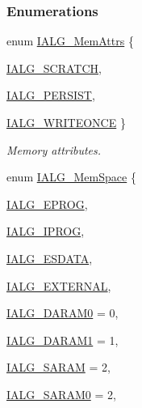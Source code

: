 \subsubsection*{Enumerations}
\begin{CompactItemize}
\item 
enum \hyperlink{group__ti__xdais___i_a_l_g_g805f1c1330403c05633277a073862e3d}{IALG\_\-Mem\-Attrs} \{ \par
\hyperlink{group__ti__xdais___i_a_l_g_gg805f1c1330403c05633277a073862e3d85e0509f7e82ebd01b57f899122de9b4}{IALG\_\-SCRATCH}, 
\par
\hyperlink{group__ti__xdais___i_a_l_g_gg805f1c1330403c05633277a073862e3d68adbe0194074e0474333b76f7d1e090}{IALG\_\-PERSIST}, 
\par
\hyperlink{group__ti__xdais___i_a_l_g_gg805f1c1330403c05633277a073862e3d42356e6aa11869bfd15f31472f49a7c6}{IALG\_\-WRITEONCE}
 \}
\begin{CompactList}\small\item\em Memory attributes. \item\end{CompactList}\item 
enum \hyperlink{group__ti__xdais___i_a_l_g_g262eb64dc7343999fa07d535ae163497}{IALG\_\-Mem\-Space} \{ \par
\hyperlink{group__ti__xdais___i_a_l_g_gg262eb64dc7343999fa07d535ae1634976410b22d1d073ab55b289ca2f3c03b35}{IALG\_\-EPROG}, 
\par
\hyperlink{group__ti__xdais___i_a_l_g_gg262eb64dc7343999fa07d535ae163497946577db145f691f81d7085fc51e2201}{IALG\_\-IPROG}, 
\par
\hyperlink{group__ti__xdais___i_a_l_g_gg262eb64dc7343999fa07d535ae16349785fff905ed5e83445e3424ce5ba03175}{IALG\_\-ESDATA}, 
\par
\hyperlink{group__ti__xdais___i_a_l_g_gg262eb64dc7343999fa07d535ae163497a98151c21c55ddaf8c1918d8007e5493}{IALG\_\-EXTERNAL}, 
\par
\hyperlink{group__ti__xdais___i_a_l_g_gg262eb64dc7343999fa07d535ae163497f6a85bf972a4d090e2c0e4d31565f879}{IALG\_\-DARAM0} =  0, 
\par
\hyperlink{group__ti__xdais___i_a_l_g_gg262eb64dc7343999fa07d535ae163497d7b3b18fc0263be0f0702d263f600d9c}{IALG\_\-DARAM1} =  1, 
\par
\hyperlink{group__ti__xdais___i_a_l_g_gg262eb64dc7343999fa07d535ae163497a5c6d8cfdb63c11fafd22bb87204c5cd}{IALG\_\-SARAM} =  2, 
\par
\hyperlink{group__ti__xdais___i_a_l_g_gg262eb64dc7343999fa07d535ae1634974b31d959f6af27a012a87957c05d9c4a}{IALG\_\-SARAM0} =  2, 

\end{CompactItemize}
